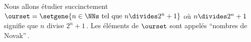 Nous allons étudier succinctement
$\ourset = \setgene{n \in \NNs \text{ tel que } n \divides 2^n + 1}$
où $n \divides 2^n + 1$ signifie que $n$ divise $2^n + 1$\,.
Les éléments de $\ourset$ sont appelés \enquote{nombres de Novak}\,. 
